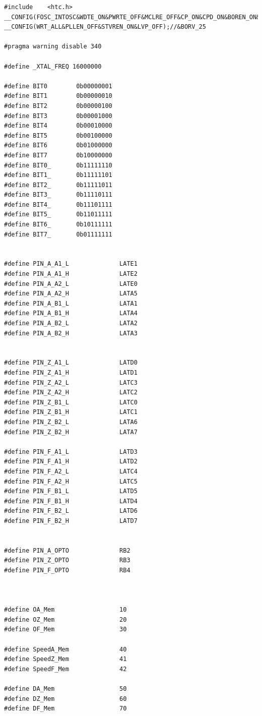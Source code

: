 \documentclass[
  a4paper,
  twoside,
  titlepage,
  12pt]{article}
\numberwithin{equation}{section}
\numberwithin{figure}{section}
\numberwithin{table}{section}
\begin{document}
\begin{verbatim}
#include    <htc.h>
__CONFIG(FOSC_INTOSC&WDTE_ON&PWRTE_OFF&MCLRE_OFF&CP_ON&CPD_ON&BOREN_ON&CLKOUTEN_OFF&IESO_OFF&FCMEN_OFF);
__CONFIG(WRT_ALL&PLLEN_OFF&STVREN_ON&LVP_OFF);//&BORV_25

#pragma warning disable 340

#define _XTAL_FREQ 16000000

#define BIT0        0b00000001
#define BIT1        0b00000010
#define BIT2        0b00000100 
#define BIT3        0b00001000
#define BIT4        0b00010000
#define BIT5        0b00100000
#define BIT6        0b01000000
#define BIT7        0b10000000
#define BIT0_       0b11111110
#define BIT1_       0b11111101
#define BIT2_       0b11111011
#define BIT3_       0b11110111
#define BIT4_       0b11101111
#define BIT5_       0b11011111
#define BIT6_       0b10111111
#define BIT7_       0b01111111


#define PIN_A_A1_L              LATE1
#define PIN_A_A1_H              LATE2
#define PIN_A_A2_L              LATE0
#define PIN_A_A2_H              LATA5
#define PIN_A_B1_L              LATA1
#define PIN_A_B1_H              LATA4
#define PIN_A_B2_L              LATA2
#define PIN_A_B2_H              LATA3


#define PIN_Z_A1_L              LATD0
#define PIN_Z_A1_H              LATD1
#define PIN_Z_A2_L              LATC3
#define PIN_Z_A2_H              LATC2
#define PIN_Z_B1_L              LATC0
#define PIN_Z_B1_H              LATC1
#define PIN_Z_B2_L              LATA6
#define PIN_Z_B2_H              LATA7

#define PIN_F_A1_L              LATD3
#define PIN_F_A1_H              LATD2
#define PIN_F_A2_L              LATC4
#define PIN_F_A2_H              LATC5
#define PIN_F_B1_L              LATD5
#define PIN_F_B1_H              LATD4
#define PIN_F_B2_L              LATD6
#define PIN_F_B2_H              LATD7


#define PIN_A_OPTO              RB2
#define PIN_Z_OPTO              RB3
#define PIN_F_OPTO              RB4



#define OA_Mem                  10
#define OZ_Mem                  20
#define OF_Mem                  30

#define SpeedA_Mem              40
#define SpeedZ_Mem              41
#define SpeedF_Mem              42

#define DA_Mem                  50
#define DZ_Mem                  60
#define DF_Mem                  70


\end{verbatim}
\end{document}
